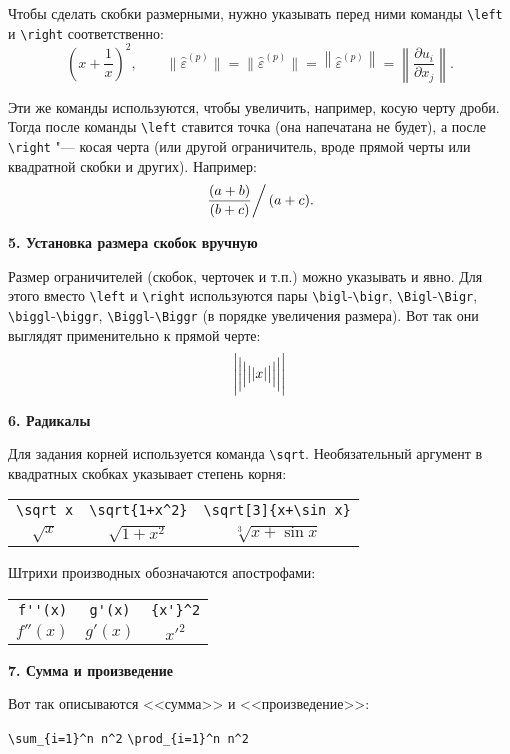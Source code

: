 \documentclass{article}
\begin{document}
Чтобы сделать скобки размерными, нужно указывать перед ними команды \verb"\left" и \verb"\right" соответственно:
\[
\left(x+\frac1{x}\right)^2,    
\qquad  
\| \hat\varepsilon^{(p)} \| = \bigl\| \hat\varepsilon^{(p)} \bigr\| = \left\| \hat\varepsilon^{(p)} \right\| = \left\| \frac{\partial u_i}{ \partial x_j} \right\|.
\]

Эти же команды используются, чтобы увеличить, например, косую черту дроби. Тогда после команды \verb"\left" ставится точка (она напечатана не будет), а после \verb"\right" "--- косая черта (или другой ограничитель, вроде прямой черты или квадратной скобки и других). Например:
\[
\left.\frac{(a+b)}{(b+c)}\right/(a+c) .
\]

\bigskip

\textbf{5. Установка размера скобок вручную}

Размер ограничителей (скобок, черточек и т.п.) можно указывать и явно. Для этого вместо \verb"\left" и \verb"\right" используются пары \verb"\bigl"-\verb"\bigr", \verb"\Bigl"-\verb"\Bigr", \verb"\biggl"-\verb"\biggr", \verb"\Biggl"-\verb"\Biggr" (в порядке увеличения размера). Вот так они выглядят применительно к прямой черте:
\[
\Biggl|\biggl|\Bigl|\bigl| |x| \bigr|\Bigr|\biggr|\Biggr|
\]


\bigskip

\textbf{6. Радикалы}

Для задания корней используется команда \verb"\sqrt". Необязательный аргумент в квадратных скобках указывает степень корня:
\begin{center}
\begin{tabular}{ccc}
\verb"\sqrt x"  &  \verb"\sqrt{1+x^2}"  &   \verb"\sqrt[3]{x+\sin x}" \\[2mm]
     $\sqrt x$  &       $\sqrt{1+x^2}$  &        $\sqrt[3]{x+\sin x}$
\end{tabular}
\end{center}


Штрихи производных обозначаются апострофами:
\begin{center}
\begin{tabular}{ccc}
\verb"f''(x)"   &   \verb"g'(x)"   &   \verb"{x'}^2"  \\[2mm]
     $f''(x)$   &        $g'(x)$   &        ${x'}^2$  
\end{tabular}
\end{center}


\bigskip

\textbf{7. Сумма и произведение}

Вот так описываются <<сумма>> и <<произведение>>:
\begin{center}
\verb"\sum_{i=1}^n n^2"   \quad    \verb"\prod_{i=1}^n n^2" 
\end{center}
\end{document}
